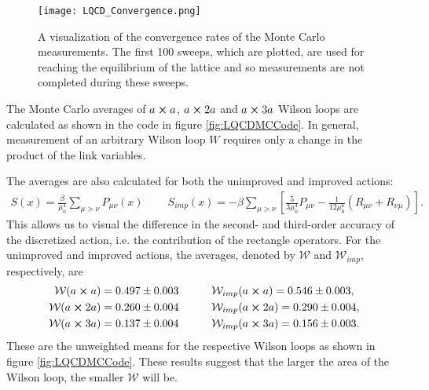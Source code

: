 \documentclass[11pt]{article}
\begin{document}
\begin{figure}[h]
	\centering
	\texttt{[image: LQCD\_Convergence.png]}
	\caption{A visualization of the convergence rates of the Monte Carlo measurements. The first 100 sweeps, which are plotted, are used for reaching the equilibrium of the lattice and so measurements are not completed during these sweeps.}
	\label{fig:LQCDConv}
\end{figure}

The Monte Carlo averages of $a\cross a$, $a\cross2a$ and $a\cross3a$ Wilson loops are calculated as shown in the code in figure \ref{fig:LQCDMCCode}. In general, measurement of an arbitrary Wilson loop $W$ requires only a change in the product of the link variables.

The averages are also calculated for both the unimproved and improved actions:
\begin{align}
	S(x)=\frac{\beta}{\mu_0^4}\sum_{\mu>\nu}P_{\mu\nu}(x)\qquad\ S_{imp}(x)=-\beta\sum_{\mu>\nu}\left[\frac{5}{3\mu_0^4}P_{\mu\nu}-\frac{1}{12\mu_0^6}(R_{\mu\nu}+R_{\nu\mu})\right].
	\label{eq:ActAgain}
\end{align}
This allows us to visual the difference in the second- and third-order accuracy of the discretized action, i.e. the contribution of the rectangle operators. For the unimproved and improved actions, the averages, denoted by $\mathcal{W}$ and $\mathcal{W}_{imp}$, respectively, are
\begin{align}
\begin{split}
	\mathcal{W}(a\cross a)=0.497\pm0.003\qquad\quad&\mathcal{W}_{imp}(a\cross a)=0.546\pm0.003,\\
	\mathcal{W}(a\cross2a)=0.260\pm0.004\qquad\quad&\mathcal{W}_{imp}(a\cross2a)=0.290\pm0.004,\\
	\mathcal{W}(a\cross3a)=0.137\pm0.004\qquad\quad&\mathcal{W}_{imp}(a\cross3a)=0.156\pm0.003.
\end{split}
\end{align}
These are the unweighted means for the respective Wilson loops as shown in figure \ref{fig:LQCDMCCode}. These results suggest that the larger the area of the Wilson loop, the smaller $\mathcal{W}$ will be.
\end{document}
